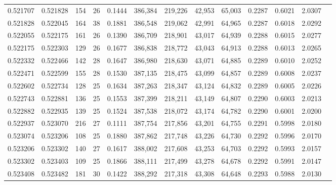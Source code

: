 \begin{tabular}{rrrrrrrrrrrrr}
0.521707 & 0.521828 &   154 &  26 &                                     0.1444 & 386,384 & 219,226 &  42,953 &  65,003 & 0.2287 & 0.6021 & 2.0307 \\
0.521828 & 0.522045 &   164 &  38 &                                     0.1881 & 386,548 & 219,062 &  42,991 &  64,965 & 0.2287 & 0.6018 & 2.0292 \\
0.522055 & 0.522175 &   161 &  26 &                                     0.1390 & 386,709 & 218,901 &  43,017 &  64,939 & 0.2288 & 0.6015 & 2.0277 \\
0.522175 & 0.522303 &   129 &  26 &                                     0.1677 & 386,838 & 218,772 &  43,043 &  64,913 & 0.2288 & 0.6013 & 2.0265 \\
0.522332 & 0.522466 &   142 &  28 &                                     0.1647 & 386,980 & 218,630 &  43,071 &  64,885 & 0.2289 & 0.6010 & 2.0252 \\
0.522471 & 0.522599 &   155 &  28 &                                     0.1530 & 387,135 & 218,475 &  43,099 &  64,857 & 0.2289 & 0.6008 & 2.0237 \\
0.522602 & 0.522734 &   128 &  25 &                                     0.1634 & 387,263 & 218,347 &  43,124 &  64,832 & 0.2289 & 0.6005 & 2.0226 \\
0.522743 & 0.522881 &   136 &  25 &                                     0.1553 & 387,399 & 218,211 &  43,149 &  64,807 & 0.2290 & 0.6003 & 2.0213 \\
0.522882 & 0.522935 &   139 &  25 &                                     0.1524 & 387,538 & 218,072 &  43,174 &  64,782 & 0.2290 & 0.6001 & 2.0200 \\
0.522937 & 0.523070 &   216 &  27 &                                     0.1111 & 387,754 & 217,856 &  43,201 &  64,755 & 0.2291 & 0.5998 & 2.0180 \\
0.523074 & 0.523206 &   108 &  25 &                                     0.1880 & 387,862 & 217,748 &  43,226 &  64,730 & 0.2292 & 0.5996 & 2.0170 \\
0.523206 & 0.523302 &   140 &  27 &                                     0.1617 & 388,002 & 217,608 &  43,253 &  64,703 & 0.2292 & 0.5993 & 2.0157 \\
0.523302 & 0.523403 &   109 &  25 &                                     0.1866 & 388,111 & 217,499 &  43,278 &  64,678 & 0.2292 & 0.5991 & 2.0147 \\
0.523408 & 0.523482 &   181 &  30 &                                     0.1422 & 388,292 & 217,318 &  43,308 &  64,648 & 0.2293 & 0.5988 & 2.0130 \\

\end{tabular}
